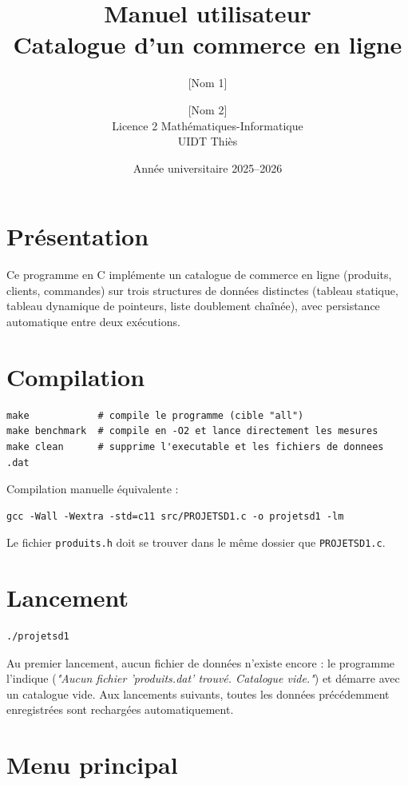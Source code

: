 \documentclass[11pt,a4paper]{article}
\title{Manuel utilisateur \\ \large Catalogue d'un commerce en ligne}
\author{[Nom 1] \and [Nom 2] \\ Licence 2 Mathématiques-Informatique \\ UIDT Thiès}
\date{Année universitaire 2025--2026}
\begin{document}
\maketitle

\section{Présentation}

Ce programme en C implémente un catalogue de commerce en ligne (produits,
clients, commandes) sur trois structures de données distinctes (tableau
statique, tableau dynamique de pointeurs, liste doublement chaînée), avec
persistance automatique entre deux exécutions.

\section{Compilation}

\begin{lstlisting}
make            # compile le programme (cible "all")
make benchmark  # compile en -O2 et lance directement les mesures
make clean      # supprime l'executable et les fichiers de donnees .dat
\end{lstlisting}

Compilation manuelle équivalente :
\begin{lstlisting}
gcc -Wall -Wextra -std=c11 src/PROJETSD1.c -o projetsd1 -lm
\end{lstlisting}

Le fichier \texttt{produits.h} doit se trouver dans le même dossier que
\texttt{PROJETSD1.c}.

\section{Lancement}

\begin{lstlisting}
./projetsd1
\end{lstlisting}

Au premier lancement, aucun fichier de données n'existe encore : le
programme l'indique (\textit{"Aucun fichier 'produits.dat' trouvé. Catalogue
vide."}) et démarre avec un catalogue vide. Aux lancements suivants, toutes
les données précédemment enregistrées sont rechargées automatiquement.

\section{Menu principal}
\end{document}
